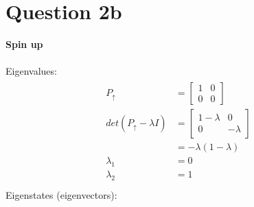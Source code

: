 \documentclass{article}
\begin{document}
\section*{Question 2b}
\textbf{Spin up}\\\\
Eigenvalues:
\begin{align*}
    \begin{split}
        P_\uparrow &= \begin{bmatrix} 1 & 0 \\ 0 & 0 \end{bmatrix} \\
        det(P_\uparrow - \lambda I) &= \begin{bmatrix} 1 - \lambda & 0 \\ 0 & -\lambda \end{bmatrix} \\
        &= -\lambda (1 - \lambda) \\
        \lambda_1 &= 0 \\
        \lambda_2 &= 1 \\
    \end{split}
\end{align*}
Eigenstates (eigenvectors):
\end{document}
